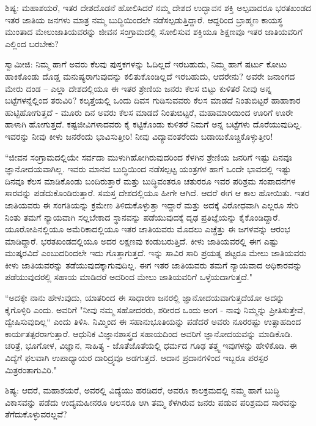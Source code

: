 ಶಿಷ್ಯ: ಮಹಾಶಯರೆ, ಇತರ ದೇಶದೊಡನೆ ಹೋಲಿಸಿದರೆ ನಮ್ಮ ದೇಶದ ಉದ್ಭಾವನ ಶಕ್ತಿ ಅಲ್ಪವಾದರೂ ಭರತಖಂಡದ ಇತರ ಜಾತಿಯ ಜನಗಳು ಮಾತ್ರ ನಮ್ಮ ಬುದ್ಧಿಯಿಂದಲೇ ನಡೆಸಲ್ಪಡುತ್ತಿದ್ದಾರೆ. ಆದ್ದರಿಂದ ಬ್ರಾಹ್ಮಣ ಕಾಯಸ್ಥ ಮುಂತಾದ ಮೇಲುಜಾತಿಯವರನ್ನು ಜೀವನ ಸಂಗ್ರಾಮದಲ್ಲಿ ಸೋಲಿಸುವ ಶಕ್ತಿಯೂ ಶಿಕ್ಷಣವೂ ಇತರ ಜಾತಿಯವರಿಗೆ ಎಲ್ಲಿಂದ ಬರಬೇಕು?

ಸ್ವಾಮೀಜಿ: ನಿಮ್ಮ ಹಾಗೆ ಅವರು ಕೆಲವು ಪುಸ್ತಕಗಳನ್ನು ಓದಿಲ್ಲದೆ ಇರಬಹುದು, ನಿಮ್ಮ ಹಾಗೆ ಷರ್ಟು ಕೋಟು ಹಾಕಿಕೊಂಡು ದೊಡ್ಡ ಮನುಷ್ಯರಾಗುವುದನ್ನು ಕಲಿತುಕೊಂಡಿಲ್ಲದೆ ಇರಬಹುದು, ಆದರೇನು? ಅವರೇ ಜನಾಂಗದ ಮೇರು ದಂಡ – ಎಲ್ಲಾ ದೇಶದಲ್ಲಿಯೂ ಈ ಇತರ ಶ್ರೇಣಿಯ ಜನರು ಕೆಲಸ ಬಿಟ್ಟು ಕುಳಿತರೆ ನೀವು ಅನ್ನ ಬಟ್ಟೆಗಳನ್ನೆಲ್ಲಿಂದ ತರುವಿರಿ? ಕಲ್ಕತ್ತೆಯಲ್ಲಿ ಒಂದು ದಿವಸ ಗುಡಿಸುವವರು ಕೆಲಸ ಮಾಡದೆ ನಿಂತುಬಿಟ್ಟರೆ ಹಾಹಾಕಾರ ಹುಟ್ಟಿಹೋಗುತ್ತದೆ - ಮೂರು ದಿನ ಅವರು ಕೆಲಸ ಮಾಡದೆ ನಿಂತುಬಿಟ್ಟರೆ, ಮಹಾಮಾರಿಯಿಂದ ಊರಿಗೆ ಊರೇ ಹಾಳಾಗಿ ಹೋಗುತ್ತದೆ. ಕಷ್ಟಜೀವಿಗಳಾದವರು ಕೈ ಕಟ್ಟಿಕೊಂಡು ಕುಳಿತರೆ ನಿಮಗೆ ಅನ್ನ ಬಟ್ಟೆಗಳು ದೊರೆಯುವುದಿಲ್ಲ. ಇವರನ್ನು ನೀವು ಕೀಳು ಜನರೆಂದು ಭಾವಿಸುತ್ತೀರಿ! ನೀವು ವಿದ್ಯಾವಂತರೆಂದು ಬಡಾಯಿಕೊಚ್ಚಿಕೊಳ್ಳುತ್ತೀರಿ!

“ಜೀವನ ಸಂಗ್ರಾಮದಲ್ಲಿಯೇ ಸರ್ವದಾ ಮುಳುಗಿಹೋಗಿರುವುದರಿಂದ ಕೆಳಗಿನ ಶ್ರೇಣಿಯ ಜನರಿಗೆ ಇಷ್ಟು ದಿನವೂ ಜ್ಞಾನೋದಯವಾಗಿಲ್ಲ. ಇವರು ಮಾನವ ಬುದ್ಧಿಯಿಂದ ನಡೆಸಲ್ಪಟ್ಟ ಯಂತ್ರಗಳ ಹಾಗೆ ಒಂದೇ ಭಾವದಲ್ಲಿ ಇಷ್ಟು ದಿನವೂ ಕೆಲಸ ಮಾಡಿಕೊಂಡು ಬಂದಿರುತ್ತಾರೆ ಮತ್ತು ಬುದ್ಧಿವಂತರೂ ಚತುರರೂ ಇವರ ಪರಿಶ್ರಮ ಸಂಪಾದನೆಗಳ ಸಾರವನ್ನು ಪಡೆದುಕೊಂಡಿರುತ್ತಾರೆ. ಸಮಸ್ತ ದೇಶದಲ್ಲಿಯೂ ಹೀಗೇ ಆಗಿದೆ. ಆದರೆ ಈಗ ಆ ಕಾಲ ಹೋಯಿತು. ಇತರ ಜಾತಿಯವರು ಈ ಸಂಗತಿಯನ್ನು ಕ್ರಮೇಣ ತಿಳಿದುಕೊಳ್ಳುತ್ತಾ ಇದ್ದಾರೆ ಮತ್ತು ಅದಕ್ಕೆ ವಿರೋಧವಾಗಿ ಎಲ್ಲರೂ ಸೇರಿ ನಿಂತು ತಮಗೆ ನ್ಯಾಯವಾಗಿ ಸಲ್ಲಬೇಕಾದ ಸ್ಥಾನವನ್ನು ಪಡೆಯುವುದಕ್ಕೆ ದೃಢ ಪ್ರತಿಜ್ಞೆಯನ್ನು ಕೈಕೊಂಡಿದ್ದಾರೆ. ಯೂರೋಪಿನಲ್ಲಿಯೂ ಅಮೆರಿಕಾದಲ್ಲಿಯೂ ಇತರ ಜಾತಿಯವರು ಮೊದಲು ಎಚ್ಚೆತ್ತು ಈ ಜಗಳವನ್ನು ಆರಂಭ ಮಾಡಿದ್ದಾರೆ. ಭರತಖಂಡದಲ್ಲಿಯೂ ಅದರ ಲಕ್ಷಣವು ಕಂಡುಬರುತ್ತಿದೆ. ಕೀಳು ಜಾತಿಯವರಲ್ಲಿ ಈಗ ಎಷ್ಟು ಮುಷ್ಕರವಿದೆ ಎಂಬುದರಿಂದಲೇ ಇದು ಗೊತ್ತಾಗುತ್ತದೆ. ಇನ್ನು ಸಾವಿರ ಸಾರಿ ಪ್ರಯತ್ನ ಪಟ್ಟರೂ ಮೇಲು ಜಾತಿಯವರು ಕೀಳು ಜಾತಿಯವರನ್ನು ತಡೆಯುವುದಕ್ಕಾಗುವುದಿಲ್ಲ. ಈಗ ಇತರ ಜಾತಿಯವರು ತಮಗೆ ನ್ಯಾಯವಾದ ಅಧಿಕಾರವನ್ನು ಪಡೆಯುವುದರಲ್ಲಿ ಸಹಾಯ ಮಾಡಿದರೆ ಅದರಿಂದ ಮೇಲು ಜಾತಿಯವರಿಗೆ ಒಳ್ಳೆಯದಾಗುತ್ತದೆ."

“ಅದಕ್ಕೇ ನಾನು ಹೇಳುವುದು, ಯಾತರಿಂದ ಈ ಸಾಧಾರಣ ಜನರಲ್ಲಿ ಜ್ಞಾನೋದಯವಾಗುತ್ತದೆಯೋ ಅದನ್ನು ಕೈಗೊಳ್ಳಿರಿ ಎಂದು. ಅವರಿಗೆ "ನೀವು ನಮ್ಮ ಸಹೋದರರು, ಶರೀರದ ಒಂದು ಅಂಗ - ನಾವು ನಿಮ್ಮನ್ನು ಪ್ರೀತಿಸುತ್ತೇವೆ, ದ್ವೇಷಿಸುವುದಿಲ್ಲ“ ಎಂದು ತಿಳಿಸಿ. ನಿಮ್ಮಿಂದ ಈ ಸಹಾನುಭೂತಿಯನ್ನು ಪಡೆದರೆ ಅವರು ನೂರರಷ್ಟು ಉತ್ಸಾಹದಿಂದ ಕಾರ್ಯತತ್ಪರರಾಗುತ್ತಾರೆ. ಆಧುನಿಕ ವಿಜ್ಞಾನಶಾಸ್ತ್ರದ ಸಹಾಯದಿಂದ ಅವರಿಗೆ ಜ್ಞಾನೋದಯವನ್ನು ಮಾಡಿಕೊಡಿ. ಚರಿತ್ರೆ, ಭೂಗೋಳ, ವಿಜ್ಞಾನ, ಸಾಹಿತ್ಯ - ಜೊತೆಜೊತೆಯಲ್ಲಿ ಧರ್ಮದ ಗೂಢ ತತ್ತ್ವ ಇವುಗಳನ್ನು ಹೇಳಿಕೊಡಿ. ಈ ವಿದ್ಯೆಗೆ ಫಲವಾಗಿ ಉಪಾಧ್ಯಾಯರ ದಾರಿದ್ರ್ಯವೂ ಅಡಗುತ್ತದೆ. ಆದಾನ ಪ್ರದಾನಗಳಿಂದ ಇಬ್ಬರೂ ಪರಸ್ಪರ ಮಿತ್ರರಂತಾಗುವಿರಿ."

ಶಿಷ್ಯ: ಆದರೆ, ಮಹಾಶಯರೆ, ಅವರಲ್ಲಿ ವಿದ್ಯೆಯು ಹರಡಿದರೆ, ಅವರೂ ಕಾಲಕ್ರಮದಲ್ಲಿ ನಮ್ಮ ಹಾಗೆ ಬುದ್ಧಿ ವಿಕಾಸವನ್ನು ಪಡೆದು ಉದ್ಯಮಹೀನರೂ ಆಲಸರೂ ಆಗಿ ತಮ್ಮ ಕೆಳಗಿರುವ ಜನರು ಪಡುವ ಪರಿಶ್ರಮದ ಸಾರವನ್ನು ತೆಗೆದುಕೊಳ್ಳುವರಲ್ಲವೆ?

